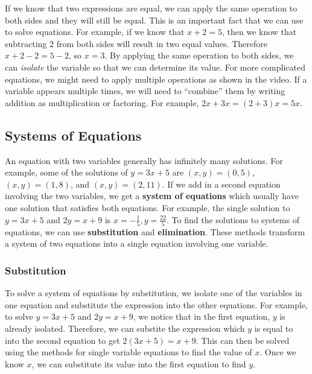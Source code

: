 \documentclass{article}
\begin{document}
    If we know that two expressions are equal, we can apply the same operation
    to both sides and they will still be equal. This is an important fact that
    we can use to solve equations. For example, if we know that $x + 2 = 5$,
    then we know that subtracting $2$ from both sides will result in two equal
    values. Therefore $x + 2 - 2 = 5 - 2$, so $x = 3$. By applying the same
    operation to both sides, we can \emph{isolate} the variable so that we can
    determine its value. For more complicated equations, we might need to apply
    multiple operations as shown in the video. If a variable appears multiple
    times, we will need to ``combine'' them by writing addition as
    multiplication or factoring. For example, $2x + 3x = (2 + 3)x = 5x$.
    \subsection*{Systems of Equations}
    An equation with two variables generally has infinitely many solutions. For
    example, some of the solutions of $y = 3x + 5$ are $(x, y) = (0, 5)$, $(x,
    y) = (1, 8)$, and $(x, y) = (2, 11)$. If we add in a second equation
    involving the two variables, we get a \textbf{system of equations} which
    usually have one solution that satisfies both equations. For example, the
    single solution to $y = 3x + 5$ and $2y = x + 9$ is $x = -\frac{1}{5}, y =
    \frac{22}{5}$. To find the solutions to systems of equations, we can use
    \textbf{substitution} and \textbf{elimination}. These methods transform a
    system of two equations into a single equation involving one variable.
    \subsubsection*{Substitution}
    To solve a system of equations by substitution, we isolate one of the
    variables in one equation and substitute the expression into the other
    equations. For example, to solve $y = 3x + 5$ and $2y = x + 9$, we notice
    that in the first equation, $y$ is already isolated. Therefore, we can
    substite the expression which $y$ is equal to into the second equation to
    get $2(3x + 5) = x + 9$. This can then be solved using the methods for
    single variable equations to find the value of $x$. Once we know $x$, we can
    substitute its value into the first equation to find $y$.
\end{document}
